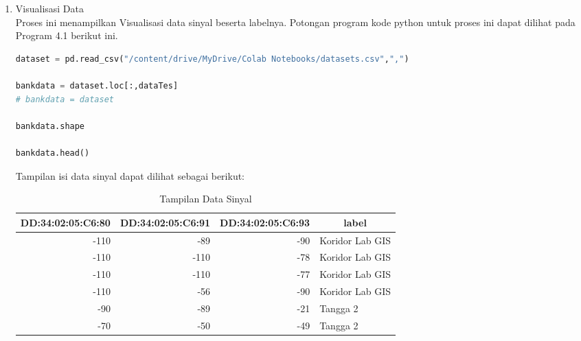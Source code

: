 \begin{enumerate} [1.]
	\item Visualisasi Data
	      \\ Proses ini menampilkan Visualisasi data sinyal beserta labelnya. Potongan program kode python untuk proses ini dapat dilihat pada Program 4.1 berikut ini.
	      \\
	      \begin{lstlisting}[label=MinMAxdanPCA,language=Python]
dataset = pd.read_csv("/content/drive/MyDrive/Colab Notebooks/datasets.csv",",")

bankdata = dataset.loc[:,dataTes]
# bankdata = dataset

bankdata.shape

bankdata.head()
					\end{lstlisting}

	      \par Tampilan isi data sinyal dapat dilihat sebagai berikut:

	      \begin{table}[H]
		      \center
		      \fontsize{10}{12}\selectfont
		      \caption{Tampilan Data Sinyal}
		      \label{Daftar-Peserta-Pengumpula-Data}
		      \begin{tabular}{|r|r|r|l|}
			      \hline
			      \multicolumn{1}{|l|}{DD:34:02:05:C6:80} & \multicolumn{1}{l|}{DD:34:02:05:C6:91} & \multicolumn{1}{l|}{DD:34:02:05:C6:93} & \multicolumn{1}{c|}{label} \\ \hline
			      -110                                    & -89                                    & -90                                    & Koridor Lab GIS            \\ \hline
			      -110                                    & -110                                   & -78                                    & Koridor Lab GIS            \\ \hline
			      -110                                    & -110                                   & -77                                    & Koridor Lab GIS            \\ \hline
			      -110                                    & -56                                    & -90                                    & Koridor Lab GIS            \\ \hline
			      -90                                     & -89                                    & -21                                    & Tangga 2                   \\ \hline
			      -70                                     & -50                                    & -49                                    & Tangga 2                   \\ \hline
		      \end{tabular}
	      \end{table}


\end{enumerate}
